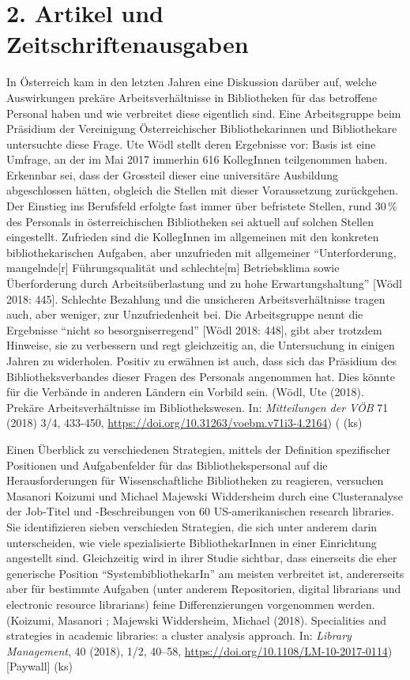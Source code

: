 \documentclass[a4paper,
fontsize=11pt,
oneside,
numbers=noperiodatend,
parskip=half-,
bibliography=totoc,
final
]{scrartcl}
\begin{document}
\hypertarget{artikel-und-zeitschriftenausgaben}{%
\section*{2. Artikel und
Zeitschriftenausgaben}\label{artikel-und-zeitschriftenausgaben}}

In Österreich kam in den letzten Jahren eine Diskussion darüber auf,
welche Auswirkungen prekäre Arbeitsverhältnisse in Bibliotheken für das
betroffene Personal haben und wie verbreitet diese eigentlich sind. Eine
Arbeitsgruppe beim Präsidium der Vereinigung Österreichischer
Bibliothekarinnen und Bibliothekare untersuchte diese Frage. Ute Wödl
stellt deren Ergebnisse vor: Basis ist eine Umfrage, an der im Mai 2017
immerhin 616 KollegInnen teilgenommen haben. Erkennbar sei, dass der
Grossteil dieser eine universitäre Ausbildung abgeschlossen hätten,
obgleich die Stellen mit dieser Voraussetzung zurückgehen. Der Einstieg
ins Berufsfeld erfolgte fast immer über befristete Stellen, rund 30\,\%
des Personals in österreichischen Bibliotheken sei aktuell auf solchen
Stellen eingestellt. Zufrieden sind die KollegInnen im allgemeinen mit
den konkreten bibliothekarischen Aufgaben, aber unzufrieden mit
allgemeiner \enquote{Unterforderung, mangelnde{[}r{]} Führungsqualität
und schlechte{[}m{]} Betriebsklima sowie Überforderung durch
Arbeitsüberlastung und zu hohe Erwartungshaltung} {[}Wödl 2018: 445{]}.
Schlechte Bezahlung und die unsicheren Arbeitsverhältnisse tragen auch,
aber weniger, zur Unzufriedenheit bei. Die Arbeitsgruppe nennt die
Ergebnisse \enquote{nicht so besorgniserregend} {[}Wödl 2018: 448{]},
gibt aber trotzdem Hinweise, sie zu verbessern und regt gleichzeitig an,
die Untersuchung in einigen Jahren zu widerholen. Positiv zu erwähnen
ist auch, dass sich das Präsidium des Bibliotheksverbandes dieser Fragen
des Personals angenommen hat. Dies könnte für die Verbände in anderen
Ländern ein Vorbild sein. (Wödl, Ute (2018). Prekäre Arbeitsverhältnisse
im Bibliothekswesen. In: \emph{Mitteilungen der VÖB} 71 (2018) 3/4,
433-450, \url{https://doi.org/10.31263/voebm.v71i3-4.2164}) ( (ks)

Einen Überblick zu verschiedenen Strategien, mittels der Definition
spezifischer Positionen und Aufgabenfelder für das Bibliothekspersonal
auf die Herausforderungen für Wissenschaftliche Bibliotheken zu
reagieren, versuchen Masanori Koizumi und Michael Majewski Widdersheim
durch eine Clusteranalyse der Job-Titel und -Beschreibungen von 60
US-amerikanischen research libraries. Sie identifizieren sieben
verschieden Strategien, die sich unter anderem darin unterscheiden, wie
viele spezialisierte BibliothekarInnen in einer Einrichtung angestellt
sind. Gleichzeitig wird in ihrer Studie sichtbar, dass einerseits die
eher generische Position \enquote{SystembibliothekarIn} am meisten
verbreitet ist, andererseits aber für bestimmte Aufgaben (unter anderem
Repositorien, digital librarians und electronic resource librarians)
feine Differenzierungen vorgenommen werden. (Koizumi, Masanori ;
Majewski Widdersheim, Michael (2018). Specialities and strategies in
academic libraries: a cluster analysis approach. In: \emph{Library
Management}, 40 (2018), 1/2, 40--58,
\url{https://doi.org/10.1108/LM-10-2017-0114}) {[}Paywall{]} (ks)
\end{document}
